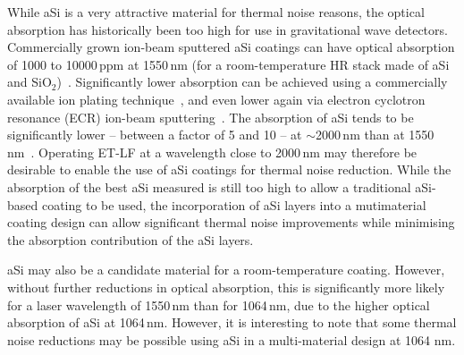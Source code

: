 While aSi is a very attractive material for thermal noise reasons, the optical absorption has historically been too high for use in gravitational wave detectors. Commercially grown ion-beam sputtered aSi coatings can have optical absorption of 1000 to 10000\,ppm at 1550\,nm (for a room-temperature HR stack made of aSi and SiO$_2$)~\cite{Steinlechner2016,Birney2018}. Significantly lower absorption can be achieved using a commercially available ion plating technique~\cite{ionplating}, and even lower again via electron cyclotron resonance (ECR) ion-beam sputtering~\cite{Birney2018}. The absorption of aSi tends to be significantly lower -- between a factor of 5 and 10 -- at $\sim$2000\,nm than at 1550\,nm~\cite{ionplating}. Operating ET-LF at a wavelength close to 2000\,nm may therefore be desirable to enable the use of aSi coatings for thermal noise reduction. While the absorption of the best aSi measured is still too high to allow a traditional aSi-based coating to be used, the incorporation of aSi layers into a mutimaterial coating design can allow significant thermal noise improvements while minimising the absorption contribution of the aSi layers.

aSi may also be a candidate material for a room-temperature coating. However, without further reductions in optical absorption, this is significantly more likely for a laser wavelength of 1550\,nm than for 1064\,nm, due to the higher optical absorption of aSi at 1064\,nm. However, it is interesting to note that some thermal noise reductions may be possible using aSi in a multi-material design at 1064 nm.

